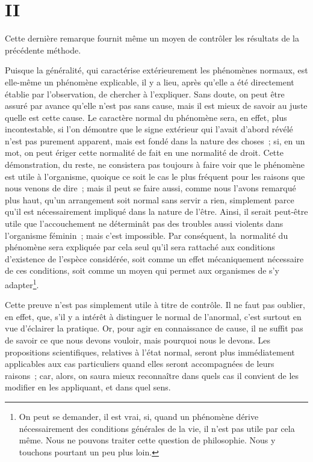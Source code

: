 \documentclass[french,twoside]{book} %
\begin{document}
\section[{II}]{II}
\noindent Cette dernière remarque fournit même un moyen de contrôler les résultats de la précédente méthode.\par
Puisque la généralité, qui caractérise extérieurement les phénomènes normaux, est elle-même un phénomène explicable, il y a lieu, après qu’elle a été directement établie par l’observation, de chercher à l’expliquer. Sans doute, on peut être assuré par avance qu’elle n’est pas sans cause, mais il est mieux de savoir au juste quelle est cette cause. Le caractère normal du phénomène sera, en effet, plus incontestable, si l’on démontre que le signe extérieur qui l’avait d’abord révélé n’est pas purement apparent, mais est fondé dans la nature des choses ; si, en un mot, on peut ériger cette normalité de fait en une normalité de droit. Cette démonstration, du reste, ne consistera pas toujours à faire voir que le phénomène est utile à l’organisme, quoique ce soit le cas le plus fréquent pour les raisons que nous venons de dire ; mais il peut se faire aussi, comme nous l’avons remarqué plus haut, qu’un arrangement soit normal sans servir a rien, simplement parce qu’il est nécessairement impliqué dans la nature de l’être. Ainsi, il serait peut-être utile que l’accouchement ne déterminât pas des troubles aussi violents dans l’organisme féminin ; mais c’est impossible. Par conséquent, la normalité du phénomène sera expliquée par cela seul qu’il sera rattaché aux conditions d’existence de l’espèce considérée, soit comme un effet mécaniquement nécessaire de ces conditions, soit comme un moyen qui permet aux organismes de s’y adapter\footnote{ On peut se demander, il est vrai, si, quand un phénomène dérive nécessairement des conditions générales de la vie, il n’est pas utile par cela même. Nous ne pouvons traiter cette question de philosophie. Nous y touchons pourtant un peu plus loin.}.\par
Cette preuve n’est pas simplement utile à titre de contrôle. Il ne faut pas oublier, en effet, que, s’il y a intérêt à distinguer le normal de l’anormal, c’est surtout en vue d’éclairer la pratique. Or, pour agir en connaissance de cause, il ne suffit pas de savoir ce que nous devons vouloir, mais pourquoi nous le devons. Les propositions scientifiques, relatives à l’état normal, seront plus immédiatement applicables aux cas particuliers quand elles seront accompagnées de leurs raisons ; car, alors, on saura mieux reconnaître dans quels cas il convient de les modifier en les appliquant, et dans quel sens.\par
\end{document}
